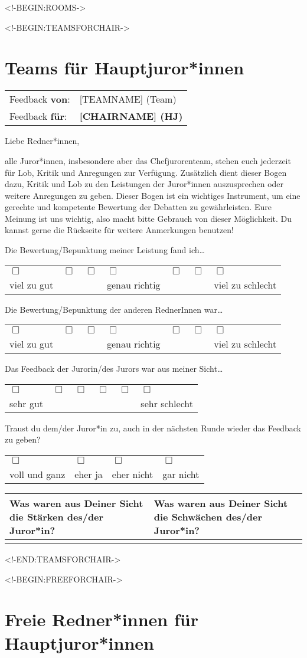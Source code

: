 \documentclass{scrartcl}
\newcommand{\questionsix}[3]{%
#3%

\medskip%

{%
  \centering%
  \begin{tabular}{>{\centering}p{0.13\textwidth}%
                  >{\centering}p{0.13\textwidth}%
                  >{\centering}p{0.13\textwidth}%
                  >{\centering}p{0.13\textwidth}%
                  >{\centering}p{0.13\textwidth}%
                  >{\centering\arraybackslash}p{0.13\textwidth}}%
    $\Box$ & $\Box$ & $\Box$ & $\Box$ & $\Box$ & $\Box$ \\%
    #1 & & & & & #2%
  \end{tabular}%
}%
}
\newcommand{\questionseven}[4]{%
#4%

\medskip%

{%
  \centering%
  \begin{tabular}{>{\centering}p{0.11\textwidth}%
                  >{\centering}p{0.11\textwidth}%
                  >{\centering}p{0.11\textwidth}%
                  >{\centering}p{0.11\textwidth}%
                  >{\centering}p{0.11\textwidth}%
                  >{\centering}p{0.11\textwidth}%
                  >{\centering\arraybackslash}p{0.11\textwidth}}%
    $\Box$ & $\Box$ & $\Box$ & $\Box$ & $\Box$ & $\Box$ & $\Box$ \\%
    #1 & & & #2 & & & #3%
  \end{tabular}%
}%
}
\newcommand{\questionfour}[1]{%
#1%

\medskip%

{%
  \centering%
  \begin{tabular}{>{\centering}p{0.23\textwidth}%
                  >{\centering}p{0.23\textwidth}%
                  >{\centering}p{0.23\textwidth}%
                  >{\centering\arraybackslash}p{0.23\textwidth}}%
    $\Box$ & $\Box$ & $\Box$ & $\Box$ \\%
    voll und ganz & eher ja & eher nicht & gar nicht %
  \end{tabular}%
}%
}
\newcommand{\strengthsandweaknesses}[1]{%
{%
  \centering%
  \begin{tabular}{|p{0.45\textwidth}|p{0.45\textwidth}|}%
    \hline%
    Was waren aus Deiner Sicht die Stärken des/der Juror*in? &%
    Was waren aus Deiner Sicht die Schwächen des/der Juror*in? \\%
    \hline%
    \bigskip & \\[#1]%
    \hline%
  \end{tabular}%
}%
}
\newcommand{\feedbackfromfor}[2]{%
\begin{tabular}{ll}%
  Feedback \textbf{von}: & #1 \\%
  Feedback \textbf{für}: & \textbf{#2}%
\end{tabular}%
}
\begin{document}
\setlength{\parindent}{0pt}

<!-BEGIN:ROOMS->

  \fancyhf{}

  <!-BEGIN:TEAMSFORCHAIR->
    \section*{Teams für Hauptjuror*innen}

    \feedbackfromfor{[TEAMNAME] (Team)}{[CHAIRNAME] (HJ)}

    \bigskip

    Liebe Redner*innen,

    \medskip

    alle Juror*innen, insbesondere aber das Chefjurorenteam, stehen euch
    jederzeit für Lob, Kritik und Anregungen zur Verfügung. Zusätzlich dient
    dieser Bogen dazu, Kritik und Lob zu den Leistungen der Juror*innen
    auszusprechen oder weitere Anregungen zu geben. Dieser Bogen ist ein
    wichtiges Instrument, um eine gerechte und kompetente Bewertung der
    Debatten zu gewährleisten. Eure Meinung ist uns wichtig, also macht bitte
    Gebrauch von dieser Möglichkeit. Du kannst gerne die Rückseite für weitere
    Anmerkungen benutzen!

    \medskip
    \hrulefill
    \medskip

    \questionseven{viel zu gut}{genau richtig}{viel zu schlecht}{
      Die Bewertung/Bepunktung meiner Leistung fand ich\dots
    }
    \medskip

    \questionseven{viel zu gut}{genau richtig}{viel zu schlecht}{
      Die Bewertung/Bepunktung der anderen RednerInnen war\dots
    }
    \medskip

    \questionsix{sehr gut}{sehr schlecht}{
      Das Feedback der Jurorin/des Jurors war aus meiner Sicht\dots
    }
    \medskip

    \questionfour{
      Traust du dem/der Juror*in zu, auch in der nächsten Runde wieder das
      Feedback zu geben?
    }
    \medskip

    \strengthsandweaknesses{6cm}

    \newpage
  <!-END:TEAMSFORCHAIR->

  <!-BEGIN:FREEFORCHAIR->
    \section*{Freie Redner*innen für Hauptjuror*innen}
\end{document}
